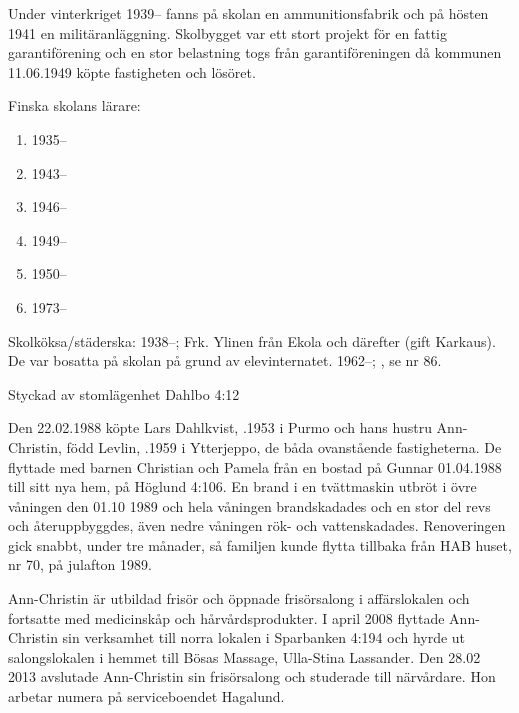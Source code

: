 Under vinterkriget 1939-- fanns på skolan en ammunitionsfabrik och	på hösten 1941 en militäranläggning. Skolbygget var ett stort projekt för en fattig garantiförening och en stor belastning togs från garantiföreningen då kommunen 11.06.1949 köpte	fastigheten och lösöret.

Finska skolans lärare:
\begin{enumerate}
  \item 1935--  
  \item 1943--	
  \item 1946--	
  \item 1949--	
  \item 1950--	
  \item 1973--	
\end{enumerate}

Skolköksa/städerska:
1938--;	Frk. Ylinen från Ekola och därefter  (gift Karkaus). De var bosatta på skolan på grund av elevinternatet.
1962--;	, se nr 86.



Styckad av stomlägenhet Dahlbo 4:12


Den 22.02.1988 köpte Lars Dahlkvist, .1953 i Purmo och	hans hustru Ann-Christin, född Levlin, .1959 i Ytterjeppo, de båda ovanstående fastigheterna. De flyttade med barnen Christian och Pamela från en bostad på Gunnar 01.04.1988 till sitt nya hem, på Höglund	4:106. En brand i en tvättmaskin utbröt i övre våningen den 01.10 1989 	och hela våningen brandskadades och en stor del revs och 	återuppbyggdes, även nedre våningen rök- och vattenskadades. 	Renoveringen gick snabbt, under tre månader, så familjen kunde flytta tillbaka från HAB huset, nr 70, på	julafton 1989.

Ann-Christin är utbildad frisör och öppnade frisörsalong i affärslokalen och fortsatte med medicinskåp och hårvårdsprodukter. I april 2008 flyttade Ann-Christin sin verksamhet till norra lokalen i Sparbanken 4:194 och hyrde ut	salongslokalen i hemmet till Bösas Massage, Ulla-Stina Lassander. Den 28.02 2013 avslutade Ann-Christin sin frisörsalong och studerade till närvårdare. Hon arbetar numera på serviceboendet Hagalund.

